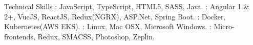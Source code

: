 \documentclass{resume}
\author{Rahmathullah M}
\begin{document}
\maketitle



\begin{category}{Technical Skills}
  : JavaScript, TypeScript, HTML5, SASS, Java.
  : Angular 1 \& 2+, VueJS, ReactJS, Redux(NGRX), ASP.Net, Spring Boot.
  : Docker, Kubernetes(AWS EKS).
  : Linux, Mac OSX, Microsoft Windows.
  : Micro-frontends, Redux, SMACSS, Photoshop, Zeplin.
\end{category} 

\end{document}
